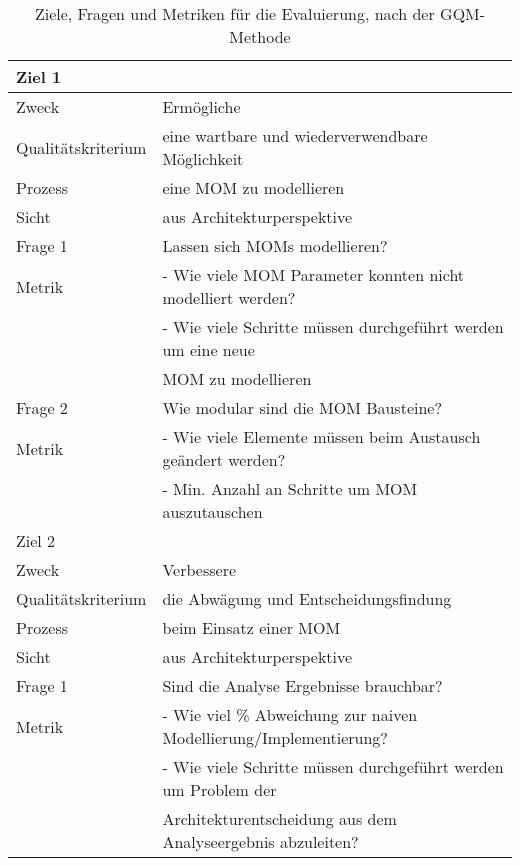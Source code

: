 \begin{table}
  \begin{tabular}{|l|l|}
    \hline
    \multicolumn{2}{|l|}{Ziel 1} \\
    \hline
    Zweck & Ermögliche \\
    Qualitätskriterium & eine wartbare und wiederverwendbare Möglichkeit  \\ 
    Prozess & eine MOM zu modellieren \\
    Sicht & aus Architekturperspektive \\
   
    \hline \hline
    Frage 1 & Lassen sich MOMs modellieren? \\
    \hline
    Metrik & - Wie viele MOM Parameter konnten nicht modelliert werden? \\
    & - Wie viele Schritte müssen durchgeführt werden um eine neue \\
    & MOM zu modellieren\\
    \hline\hline
    Frage 2 & Wie modular sind die MOM Bausteine? \\
    \hline
    Metrik & - Wie viele Elemente müssen beim Austausch geändert werden? \\
    & - Min. Anzahl an Schritte um MOM auszutauschen \\
    \hline\hline
    \multicolumn{2}{|l|}{Ziel 2} \\
    \hline
    Zweck & Verbessere \\
    Qualitätskriterium & die Abwägung und Entscheidungsfindung  \\ 
    Prozess & beim Einsatz einer MOM \\
    Sicht & aus Architekturperspektive \\
    \hline \hline
    Frage 1 & Sind die Analyse Ergebnisse brauchbar? \\
    \hline
    Metrik & - Wie viel \% Abweichung zur naiven Modellierung/Implementierung? \\
    & - Wie viele Schritte müssen durchgeführt werden um Problem der \\
    & Architekturentscheidung aus dem Analyseergebnis abzuleiten? \\
    \hline
  \end{tabular}
	\caption{\label{tab:gqm} Ziele, Fragen und Metriken für die Evaluierung, nach der GQM-Methode}
\end{table}
